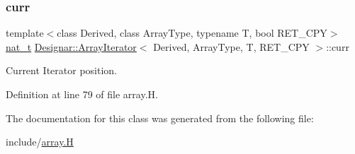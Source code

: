 \subsubsection{\texorpdfstring{curr}{curr}}
{\footnotesize\ttfamily template$<$class Derived, class Array\+Type, typename T, bool R\+E\+T\+\_\+\+C\+PY$>$ \\
\hyperlink{namespace_designar_aa72662848b9f4815e7bf31a7cf3e33d1}{nat\+\_\+t} \hyperlink{class_designar_1_1_array_iterator}{Designar\+::\+Array\+Iterator}$<$ Derived, Array\+Type, T, R\+E\+T\+\_\+\+C\+PY $>$\+::curr\hspace{0.3cm}{\ttfamily [protected]}}



Current Iterator position. 



Definition at line 79 of file array.\+H.



The documentation for this class was generated from the following file\+:\begin{DoxyCompactItemize}
\item 
include/\hyperlink{array_8_h}{array.\+H}\end{DoxyCompactItemize}
